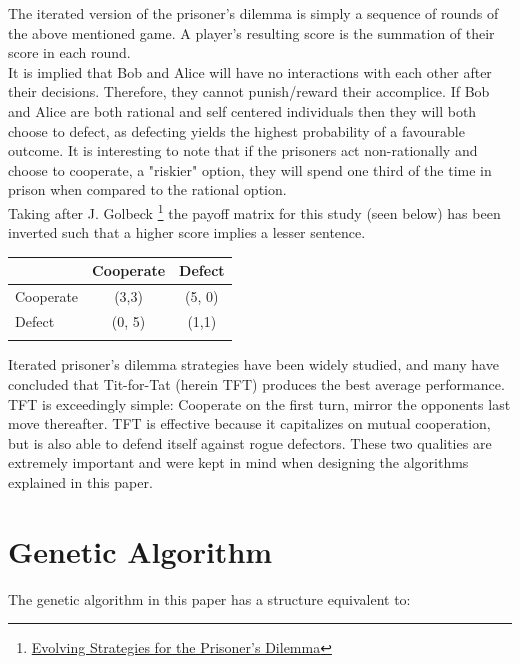 \documentclass[12pt]{article}
\begin{document}
The iterated version of the prisoner's dilemma is simply a sequence of rounds of
the above mentioned game.  A player's resulting score is the summation of their score in
each round. \\

It is implied that Bob and Alice will have no interactions with each other after
their decisions. Therefore, they cannot punish/reward their accomplice. If Bob and Alice are
both rational and self centered individuals then they will both choose to defect, 
as defecting yields the highest probability of a favourable outcome.
It is interesting to note
that if the prisoners act non-rationally and choose to cooperate, a "riskier" option, they will spend one third of the time in prison when compared
to the rational option. \\

Taking after J. Golbeck
\footnote{\href{http://cgis.cs.umd.edu/~golbeck/downloads/JGolbeck\_prison.pdf}
{Evolving Strategies for the Prisoner's Dilemma}}
the payoff matrix for this study (seen below) has been
inverted such that a higher score implies a lesser sentence. \\

\begin{center}
    \begin{tabular}{l | c | c}
         & Cooperate & Defect \\
        \hline
        Cooperate & (3,3) & (5, 0)\\
        \hline
        Defect & (0, 5) & (1,1) \\ \\
    \end{tabular}
\end{center}

Iterated prisoner's dilemma strategies have been widely studied, and many have
concluded that Tit-for-Tat (herein TFT) produces the best average performance.
TFT is exceedingly simple: Cooperate on the first turn, mirror the opponents
last move thereafter.  TFT is effective because it capitalizes on mutual
cooperation, but is also able to defend itself against rogue defectors.  These
two qualities are extremely important and were kept in mind when designing the
algorithms explained in this paper.
\section{Genetic Algorithm}

The genetic algorithm in this paper has a structure equivalent to: \\
\end{document}
